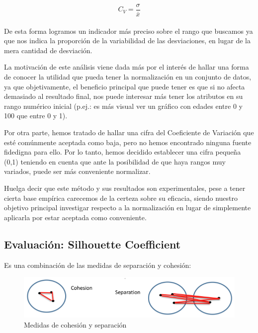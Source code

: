 \documentclass[10pt,a4paper]{article}
\begin{document}
\begin{equation}
C_{V}=\frac{\sigma}{\bar{x}}
 \end{equation}\\

De esta forma logramos un indicador más preciso sobre el rango que buscamos ya que nos indica la proporción de la variabilidad de las desviaciones, en lugar de la mera cantidad de desviación.

La motivación de este análisis viene dada más por el interés de hallar una forma de conocer la utilidad que pueda tener la normalización en un conjunto de datos, ya que objetivamente, el beneficio principal que puede tener es que si no afecta demasiado al resultado final, nos puede interesar más tener los atributos en su rango numérico inicial (p.ej.: es más visual ver un gráfico con edades entre 0 y 100 que entre 0 y 1).

Por otra parte, hemos tratado de hallar una cifra del Coeficiente de Variación que esté comúnmente aceptada como baja, pero no hemos encontrado ninguna fuente fidedigna para ello. Por lo tanto, hemos decidido establecer una cifra pequeña (0,1) teniendo en cuenta que ante la posibilidad de que haya rangos muy variados, puede ser más conveniente normalizar.

Huelga decir que este método y sus resultados son experimentales, pese a tener cierta base empírica carecemos de la certeza sobre su eficacia, siendo nuestro objetivo principal investigar respecto a la normalización en lugar de simplemente aplicarla por estar aceptada como conveniente. 

\subsection{Evaluación: Silhouette Coefficient}

Es una combinación de las medidas de separación y cohesión:

\begin{figure}[H]
	\centering
	\includegraphics[scale=0.50]{./img/silhouette00.png}%
	\caption[Clusters:Separación y cohesión]{Medidas de cohesión y separación}
	\label{fig:medidas}
\end{figure}
\end{document}
